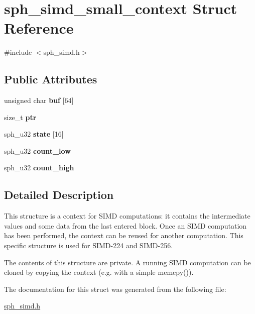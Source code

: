 \hypertarget{structsph__simd__small__context}{}\section{sph\+\_\+simd\+\_\+small\+\_\+context Struct Reference}
\label{structsph__simd__small__context}


{\ttfamily \#include $<$sph\+\_\+simd.\+h$>$}

\subsection*{Public Attributes}
\begin{DoxyCompactItemize}
\item 
\mbox{\label{structsph__simd__small__context_ad880e8f6b32fcd022c0b3bd6cf864957}} 
unsigned char {\bfseries buf} \mbox{[}64\mbox{]}
\item 
\mbox{\label{structsph__simd__small__context_ac8a2be8d4bc194be8b4cdab9cbc788b0}} 
size\+\_\+t {\bfseries ptr}
\item 
\mbox{\label{structsph__simd__small__context_a630fc1290014a94a6ba31e68075b335d}} 
sph\+\_\+u32 {\bfseries state} \mbox{[}16\mbox{]}
\item 
\mbox{\label{structsph__simd__small__context_abcf803634afa1870e3215e5f0566a20e}} 
sph\+\_\+u32 {\bfseries count\+\_\+low}
\item 
\mbox{\label{structsph__simd__small__context_aa4980f9828e1c0449f40efba36f6b903}} 
sph\+\_\+u32 {\bfseries count\+\_\+high}
\end{DoxyCompactItemize}


\subsection{Detailed Description}
This structure is a context for S\+I\+MD computations\+: it contains the intermediate values and some data from the last entered block. Once an S\+I\+MD computation has been performed, the context can be reused for another computation. This specific structure is used for S\+I\+M\+D-\/224 and S\+I\+M\+D-\/256.

The contents of this structure are private. A running S\+I\+MD computation can be cloned by copying the context (e.\+g. with a simple {\ttfamily memcpy()}). 

The documentation for this struct was generated from the following file\+:\begin{DoxyCompactItemize}
\item 
\mbox{\hyperlink{sph__simd_8h}{sph\+\_\+simd.\+h}}\end{DoxyCompactItemize}
